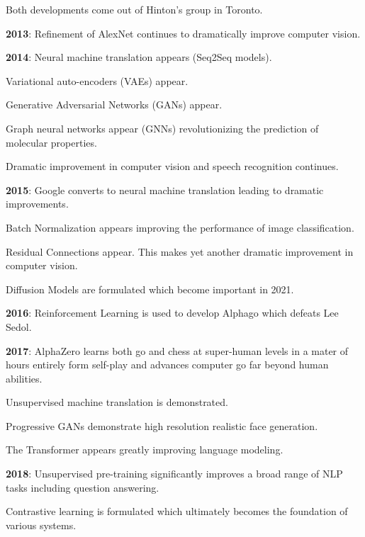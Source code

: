 {\vfill
Both developments come out of Hinton's group in Toronto.

\vfill
{\bf 2013}: Refinement of AlexNet continues to dramatically improve computer vision.


{\bf 2014}: Neural machine translation appears (Seq2Seq models).

\vfill
{\color{red} Variational auto-encoders} (VAEs) appear.

\vfill
{\color{red} Generative Adversarial Networks} (GANs) appear.

\vfill
{\color{red} Graph neural networks appear} (GNNs) revolutionizing the prediction of molecular properties.

\vfill
Dramatic improvement in computer vision and speech recognition continues.


{\bf 2015}: Google converts to neural machine translation leading to dramatic improvements.

\vfill
{\color{red} Batch Normalization} appears improving the performance of image classification.

\vfill
{{\color{red} Residual Connections} appear.  This makes yet another dramatic improvement in computer vision.

\vfill
{\color{red} Diffusion Models} are formulated which become important in 2021.

\vfill
{\bf 2016}: {\color{red} Reinforcement Learning} is used to develop Alphago which defeats Lee Sedol.


{\bf 2017}: AlphaZero learns both go and chess at super-human levels in a mater of hours entirely form self-play and advances computer go far beyond human abilities.

\vfill
Unsupervised machine translation is demonstrated.

\vfill
Progressive GANs demonstrate high resolution realistic face generation.

\vfill
The {\color{red} Transformer} appears greatly improving language modeling.


{\bf 2018}: {\color{red} Unsupervised pre-training} significantly improves a broad range of NLP tasks including question answering.

\vfill

{\color{red} Contrastive learning} is formulated which ultimately becomes the foundation of various systems.

}}
